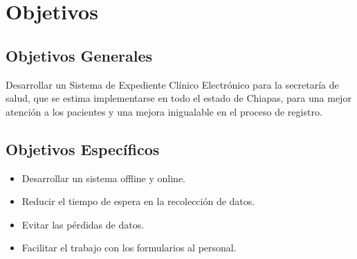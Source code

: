 \section{Objetivos}

    \subsection{Objetivos Generales}
    \label{subsec:objGrales}
  Desarrollar un Sistema de Expediente Clínico Electrónico para la secretaría de salud, que se estima implementarse en todo el estado de Chiapas, para una mejor atención a los pacientes y una mejora inigualable en el proceso de registro.

    \subsection{Objetivos Específicos}
\begin{itemize}
  \item Desarrollar un sistema offline y online.
  \item Reducir el tiempo de espera en la recolección de datos.
  \item Evitar las pérdidas de datos.
  \item Facilitar el trabajo con los formularios al personal.

\end{itemize}
